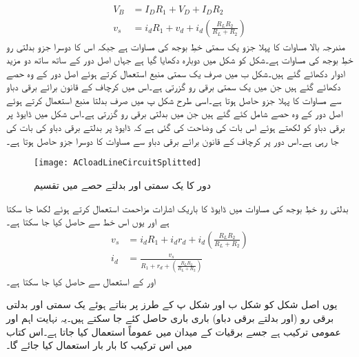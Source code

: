 \begin{align} \label{مساوات_ٹرانزسٹر_یکسمتی_بدلتا_بار_کے_خط}
V_B&=I_D R_1 +V_D+I_D R_2\\
v_s&=i_d R_1+v_d+i_d \left (\frac{R_L R_2}{R_L+R_2} \right )
\end{align}
مندرجہ بالا مساوات کا پہلا جزو یک سمتی خطِ بوجھ کی مساوات ہے جبکہ اس کا دوسرا جزو بدلتی رو خطِ بوجھ کی مساوات ہے۔شکل  کو شکل  میں دوبارہ دکھایا گیا ہے جہاں اصل دور کے ساتھ ساتھ دو مزید ادوار دکھائے گئے ہیں۔شکل  ب میں صرف  یک سمتی منبع  استعمال کرتے ہوئے اصل دور کے وہ حصے دکھائے گئے ہیں جن میں یک سمتی برقی رو  گزرتی ہے۔اس میں کرچاف کے قانون برائے برقی دباو سے مساوات  کا پہلا جزو حاصل ہوتا ہے۔اسی طرح شکل  پ میں صرف بدلتا منبع  استعمال کرتے ہوئے اصل دور کے وہ حصے شامل کئے گئے ہیں جن میں بدلتی برقی رو  گزرتی ہے۔اس شکل میں ڈایوڈ پر برقی دباو کو  لکھتے ہوئے اس بات کی وضاحت کی گئی ہے کہ ڈایوڈ پر بدلتے برقی دباو کی بات کی جا رہی ہے۔اس دور پر کرچاف کے قانون برائے برقی دباو سے مساوات   کا دوسرا جزو حاصل ہوتا ہے۔
\begin{figure}
\centering
\texttt{[image: ACloadLineCircuitSplitted]}
\caption{دور کا یک سمتی اور بدلتے حصے میں تقسیم }
\label{شکل_دور_کا_یکسمتی_اور_بدلتا_حصہ}
\end{figure}
بدلتی رو خطِ بوجھ کی مساوات میں ڈایوڈ کا باریک اشارات مزاحمت   استعمال کرتے ہوئے  لکھا جا سکتا ہے اور یوں اس خط سے   حاصل کیا جا سکتا ہے۔
\begin{align*}
v_s&=i_d R_1+i_d r_d + i_d \left (\frac{R_L R_2}{R_L+R_2} \right )\\
i_d&=\frac{v_s}{R_1+r_d+\left (\frac{R_L R_2}{R_L+R_2} \right )}
\end{align*}
اور   کے استعمال سے حاصل کیا جا سکتا ہے۔

یوں اصل شکل کو شکل  ب اور شکل  پ کے طرز پر بناتے ہوئے یک سمتی اور بدلتی برقی رو (اور بدلتے برقی دباو) باری باری حاصل کئے جا سکتے ہیں۔یہ نہایت اہم اور عمومی ترکیب ہے جسے برقیات کے میدان میں عموماً استعمال کیا جاتا ہے۔اس کتاب میں اس ترکیب کا بار بار استعمال کیا جائے گا۔ 

